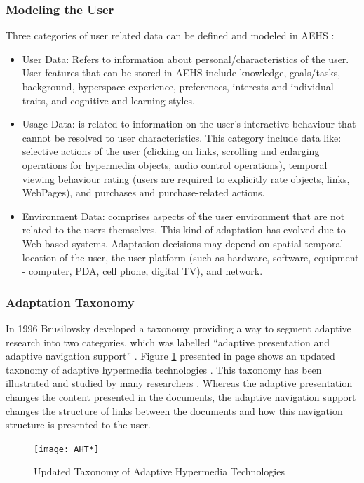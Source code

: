 \documentclass[12pt,a4paper,final,twoside,onecolumn,titlepage]{book}
\begin{document}
\subsubsection{Modeling the User}
Three categories of user related data can be defined and modeled in \gls{AEHS} \cite{R14,R19}:
\begin{itemize}
\item User Data: Refers to information about personal/characteristics of the user. User features that can be stored in \gls{AEHS} include knowledge, goals/tasks, background, hyperspace experience, preferences, interests and individual traits, and cognitive and learning styles.
\item Usage Data: is related to information on the user's interactive behaviour that cannot be resolved to user characteristics. This category include data like: selective actions of the user (clicking on links, scrolling and enlarging operations for hypermedia objects, audio control operations), temporal viewing behaviour rating (users are required to explicitly rate objects, links, WebPages), and purchases and purchase-related actions.
\item Environment Data: comprises aspects of the user environment that are not related to the users themselves. This kind of adaptation has evolved due to Web-based systems. Adaptation decisions may depend on spatial-temporal location of the user, the user platform (such as hardware, software, equipment - computer, PDA, cell phone, digital TV), and network.
\end{itemize}
\subsubsection{Adaptation Taxonomy}
In 1996 Brusilovsky developed a taxonomy providing a way to segment adaptive research into two categories, which was labelled “adaptive presentation and adaptive navigation support” \cite{R20}. Figure \ref{AHT} presented in page \pageref{AHT} shows an updated taxonomy of adaptive hypermedia technologies \cite{R21}. This taxonomy has been illustrated and studied by many researchers \cite{R14,R22}. Whereas the adaptive presentation changes the content presented in the documents, the adaptive navigation support changes the structure of links between the documents and how this navigation structure is presented to the user. 
\begin{figure}
\texttt{[image: AHT*]}
\caption{Updated Taxonomy of Adaptive Hypermedia Technologies}
\label{AHT}
\end{figure}
\end{document}
